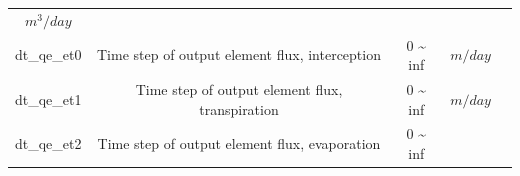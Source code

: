 \documentclass[]{scrbook}
\begin{document}
\begin{longtable}[]{@{}ccccc@{}}
\begin{minipage}[t]{0.10\columnwidth}
\(m^3/day\)\strut
\end{minipage} & \begin{minipage}[t]{0.26\columnwidth}\centering\strut
\strut
\end{minipage}\tabularnewline
\begin{minipage}[t]{0.17\columnwidth}\centering\strut
dt\_qe\_et0\strut
\end{minipage} & \begin{minipage}[t]{0.23\columnwidth}\centering\strut
Time step of output element flux, interception\strut
\end{minipage} & \begin{minipage}[t]{0.10\columnwidth}\centering\strut
0 \textasciitilde{} inf\strut
\end{minipage} & \begin{minipage}[t]{0.10\columnwidth}\centering\strut
\(m/day\)\strut
\end{minipage} & \begin{minipage}[t]{0.26\columnwidth}\centering\strut
\strut
\end{minipage}\tabularnewline
\begin{minipage}[t]{0.17\columnwidth}\centering\strut
dt\_qe\_et1\strut
\end{minipage} & \begin{minipage}[t]{0.23\columnwidth}\centering\strut
Time step of output element flux, transpiration\strut
\end{minipage} & \begin{minipage}[t]{0.10\columnwidth}\centering\strut
0 \textasciitilde{} inf\strut
\end{minipage} & \begin{minipage}[t]{0.10\columnwidth}\centering\strut
\(m/day\)\strut
\end{minipage} & \begin{minipage}[t]{0.26\columnwidth}\centering\strut
\strut
\end{minipage}\tabularnewline
\begin{minipage}[t]{0.17\columnwidth}\centering\strut
dt\_qe\_et2\strut
\end{minipage} & \begin{minipage}[t]{0.23\columnwidth}\centering\strut
Time step of output element flux, evaporation\strut
\end{minipage} & \begin{minipage}[t]{0.10\columnwidth}\centering\strut
0 \textasciitilde{} inf\strut
\end{minipage} & \begin{minipage}[t]{0.10\columnwidth}\centering\strut

\end{minipage}
\end{longtable}
\end{document}
